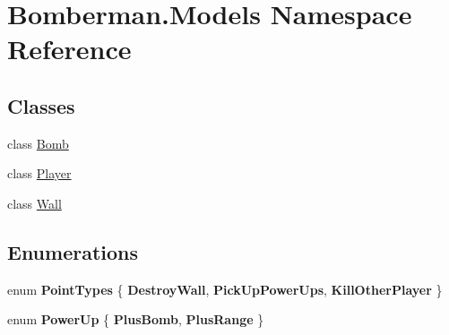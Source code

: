 \hypertarget{namespace_bomberman_1_1_models}{}\section{Bomberman.\+Models Namespace Reference}
\label{namespace_bomberman_1_1_models}
\subsection*{Classes}
\begin{DoxyCompactItemize}
\item 
class \mbox{\hyperlink{class_bomberman_1_1_models_1_1_bomb}{Bomb}}
\item 
class \mbox{\hyperlink{class_bomberman_1_1_models_1_1_player}{Player}}
\item 
class \mbox{\hyperlink{class_bomberman_1_1_models_1_1_wall}{Wall}}
\end{DoxyCompactItemize}
\subsection*{Enumerations}
\begin{DoxyCompactItemize}
\item 
\mbox{\label{namespace_bomberman_1_1_models_a163e8341a0791ab6cb445f423f68d8f9}} 
enum {\bfseries Point\+Types} \{ {\bfseries Destroy\+Wall}, 
{\bfseries Pick\+Up\+Power\+Ups}, 
{\bfseries Kill\+Other\+Player}
 \}
\item 
\mbox{\label{namespace_bomberman_1_1_models_a7d6dd860abd350b9bbbba37dcf42d920}} 
enum {\bfseries Power\+Up} \{ {\bfseries Plus\+Bomb}, 
{\bfseries Plus\+Range}
 \}
\end{DoxyCompactItemize}
